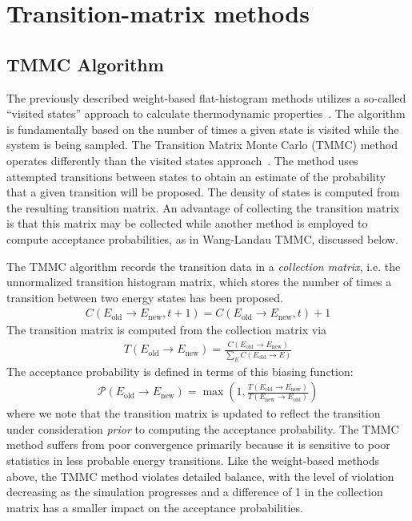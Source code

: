 \documentclass[letterpaper,twocolumn,amsmath,amssymb,pre,aps,10pt]{revtex4-1}
\begin{document}
\section{Transition-matrix methods}\label{sec:transition}

\subsection{TMMC Algorithm}
The previously described weight-based flat-histogram methods utilizes a so-called
``visited states'' approach to calculate  thermodynamic
properties~\cite{errington2003direct}. The algorithm is fundamentally
based on the number of times a given state is visited while the
system is being sampled. The Transition Matrix Monte Carlo (TMMC) method operates
differently than the visited states approach~\cite{fitzgerald2000monte}.
The method uses attempted transitions between states to obtain an estimate of
the probability that a given transition will be proposed.  The density
of states is computed from the resulting transition matrix.  An advantage
of collecting the transition matrix is that this matrix may be collected
while another method is employed to compute acceptance probabilities, as
in Wang-Landau TMMC, discussed below.

The TMMC algorithm records the transition data in a \emph{collection matrix},
i.e. the unnormalized transition histogram matrix, which stores the number
of times a transition between two energy states has been proposed.
\begin{align}
  C(E_{\text{old}} \rightarrow E_{\text{new}},t+1)
     = C(E_{\text{old}} \rightarrow E_{\text{new}},t) + 1
\end{align}
The transition matrix is computed from the collection matrix via
\begin{align}
  T(E_{\text{old}} \rightarrow E_{\text{new}})
   = \frac{C(E_{\text{old}} \rightarrow E_{\text{new}})}{
     \sum_E C(E_{\text{old}} \rightarrow E)
  }
\end{align}
The acceptance probability is defined in terms of this biasing function:
\begin{align}
  \mathcal{P}(E_{\text{old}} \rightarrow E_{\text{new}}) =
  \max\left(1,\frac{T(E_{\text{old}} \rightarrow E_{\text{new}})}{
       T(E_{\text{new}} \rightarrow E_{\text{old}})}\right)
\end{align}
where we note that the transition matrix is updated to reflect the
transition under consideration \emph{prior} to computing the acceptance
probability.  The TMMC method suffers from poor convergence primarily
because it is sensitive to poor statistics in less probable energy
transitions.  Like the weight-based methods above, the TMMC method violates
detailed balance, with the level of violation decreasing as the simulation
progresses and a difference of 1 in the collection matrix has a smaller
impact on the acceptance probabilities.
\end{document}
